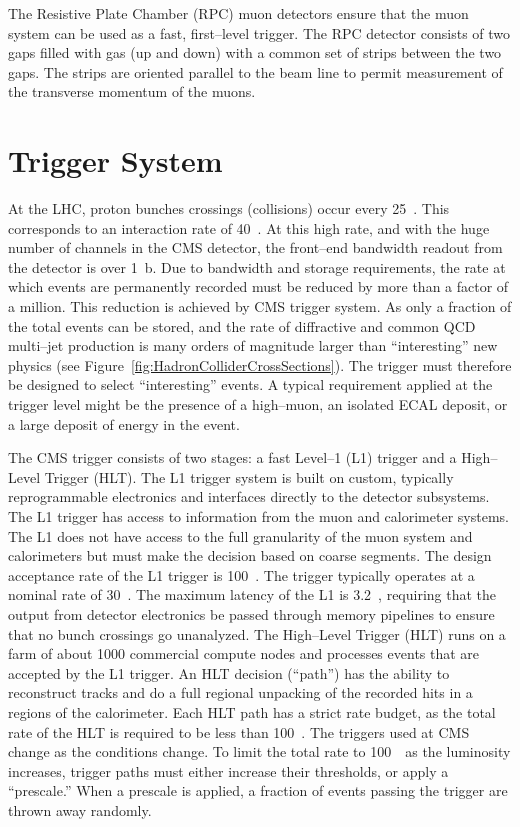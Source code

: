 The Resistive Plate Chamber (RPC) muon detectors ensure that the muon system can
be used as a fast, first--level trigger.  The RPC detector consists of two gaps
filled with gas (up and down) with a common set of strips between the two gaps.
The strips are oriented parallel to the beam line to permit measurement of the
transverse momentum of the muons.

\section{Trigger System}
\label{sec:Trigger}

At the LHC, proton bunches crossings (collisions) occur every 25~\nano\second.
This corresponds to an interaction rate of 40~\mega\hertz.  At this high rate, and
with the huge number of channels in the CMS detector, the front--end bandwidth
readout from the detector is over 1~\peta b\per\second.  Due to bandwidth and
storage requirements, the rate at which events are permanently recorded must be
reduced by more than a factor of a million. This reduction is achieved by CMS
trigger system.  As only a fraction of the total events can be stored, and the
rate of diffractive and common QCD multi--jet production is many orders of
magnitude larger than ``interesting'' new physics (see
Figure~\ref{fig:HadronColliderCrossSections}).  The trigger must therefore be
designed to select ``interesting'' events.  A typical requirement applied at the
trigger level might be the presence of a high--\pt muon, an isolated ECAL
deposit, or a large deposit of energy in the event.

The CMS trigger consists of two stages: a fast Level--1 (L1) trigger and a
High--Level Trigger (HLT).  The L1 trigger system is built on custom, typically
reprogrammable electronics and interfaces directly to the detector subsystems.
The L1 trigger has access to information from the muon and calorimeter systems.
The L1 does not have access to the full granularity of the muon system and
calorimeters but must make the decision based on coarse segments.  The design
acceptance rate of the L1 trigger is 100~\kilo\hertz.  The trigger typically
operates at a nominal rate of 30~\kilo\hertz.  The maximum latency of the L1 is
3.2~\micro\second, requiring that the output from detector electronics be passed
through memory pipelines to ensure that no bunch crossings go unanalyzed.  The
High--Level Trigger (HLT) runs on a farm of about 1000 commercial compute nodes
and processes events that are accepted by the L1 trigger.  An HLT decision
(``path'') has the ability to reconstruct tracks and do a full regional
unpacking of the recorded hits in a regions of the calorimeter.  Each HLT path
has a strict rate budget, as the total rate of the HLT is required to be less
than 100~\hertz.  The triggers used at CMS change as the conditions change.  To
limit the total rate to 100~\hertz~as the luminosity increases, trigger paths
must either increase their thresholds, or apply a ``prescale.'' When a prescale
is applied, a fraction of events passing the trigger are thrown away randomly.

